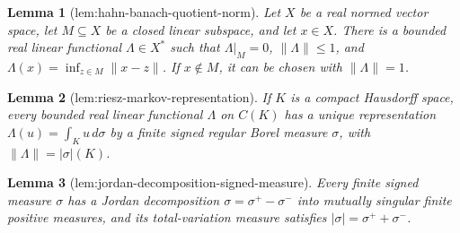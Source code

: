 \documentclass{article}
\newtheorem{lemma}{Lemma}
\begin{document}
\begin{lemma}[lem:hahn-banach-quotient-norm]\label{lem:hahn-banach-quotient-norm}
Let \(X\) be a real normed vector space, let \(M\subseteq X\) be a closed linear subspace, and let \(x\in X\).  There is a bounded real linear functional \(\Lambda\in X^*\) such that \(\Lambda|_M=0\), \(\|\Lambda\|\leq1\), and \(\Lambda(x)=\inf_{z\in M}\|x-z\|\).  If \(x\notin M\), it can be chosen with \(\|\Lambda\|=1\).
\end{lemma}

\begin{lemma}[lem:riesz-markov-representation]\label{lem:riesz-markov-representation}
If \(K\) is a compact Hausdorff space, every bounded real linear functional \(\Lambda\) on \(C(K)\) has a unique representation \(\Lambda(u)=\int_Ku\,d\sigma\) by a finite signed regular Borel measure \(\sigma\), with \(\|\Lambda\|=|\sigma|(K)\).
\end{lemma}

\begin{lemma}[lem:jordan-decomposition-signed-measure]\label{lem:jordan-decomposition-signed-measure}
Every finite signed measure \(\sigma\) has a Jordan decomposition \(\sigma=\sigma^+-\sigma^-\) into mutually singular finite positive measures, and its total-variation measure satisfies \(|\sigma|=\sigma^++\sigma^-\).
\end{lemma}
\end{document}
